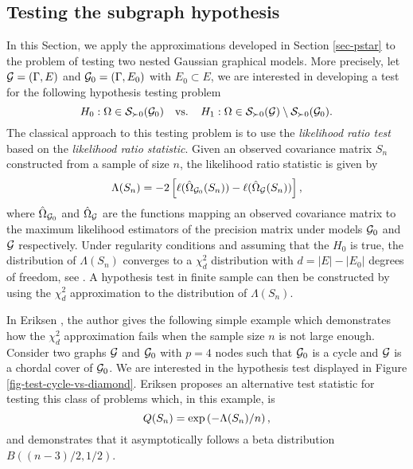 \subsection{Testing the subgraph hypothesis} \label{sec-hyp-test}


In this Section, we apply the approximations developed in Section \ref{sec-pstar} to the problem of testing two nested Gaussian graphical models. More precisely, let ${\mathcal{G}} = (\Gamma, E)$ and ${\mathcal{G}}_0 = (\Gamma, E_0)$ with $E_0 \subset E$, we are interested in developing a test for the following hypothesis testing problem
\begin{equation} \label{eq-null-general-graph}
    H_0 : \Omega \in {\mathcal{S}}_{\succ 0}({\mathcal{G}}_0)\ \ {\textrm{ vs. }}\ \ H_1 : \Omega \in {\mathcal{S}}_{\succ 0}({\mathcal{G}}) \setminus {\mathcal{S}}_{\succ 0}({\mathcal{G}}_0).
\end{equation}
The classical approach to this testing  problem is to use the \textit{likelihood ratio test} based on the \textit{likelihood ratio statistic}. Given an observed covariance matrix $S_n$ constructed from a sample of size $n$, the likelihood ratio statistic is given by
\begin{equation*}
    \Lambda(S_n) = -2 \left[\ell(\hat\Omega_{{\mathcal{G}}_0}(S_n)) - \ell(\hat\Omega_{\mathcal{G}}(S_n))\right],
\end{equation*}
where $\hat\Omega_{{\mathcal{G}}_0}$ and $\hat\Omega_{\mathcal{G}}$ are the functions mapping an observed covariance matrix to the maximum likelihood estimators of the precision matrix under models ${\mathcal{G}}_0$ and ${\mathcal{G}}$ respectively. Under regularity conditions and assuming that the $H_0$ is true, the distribution of $\Lambda(S_n)$ converges to a $\chi^2_d$ distribution with $d = |E| - |E_0|$ degrees of freedom, see \cite{wilks1938large}. A hypothesis test in finite sample can then be constructed by using the $\chi^2_d$ approximation to the distribution of $\Lambda(S_n)$.

In Eriksen \cite{eriksen1996tests}, the author gives the following simple example which demonstrates how the $\chi^2_d$ approximation fails when the sample size $n$ is not large enough. Consider two graphs ${\mathcal{G}}$ and ${\mathcal{G}}_0$ with $p = 4$ nodes such that ${\mathcal{G}}_0$ is a cycle and ${\mathcal{G}}$ is a chordal cover of ${\mathcal{G}}_0$. We are interested in the hypothesis test displayed in Figure \ref{fig-test-cycle-vs-diamond}. Eriksen proposes an alternative test statistic for testing this class of problems which, in this example, is
\begin{equation} \label{eq-q-stat}
    Q(S_n) = \exp\left(-\Lambda(S_n) / n\right),
\end{equation}
and demonstrates that it asymptotically follows a beta distribution $B((n - 3)/2, 1/2)$.



